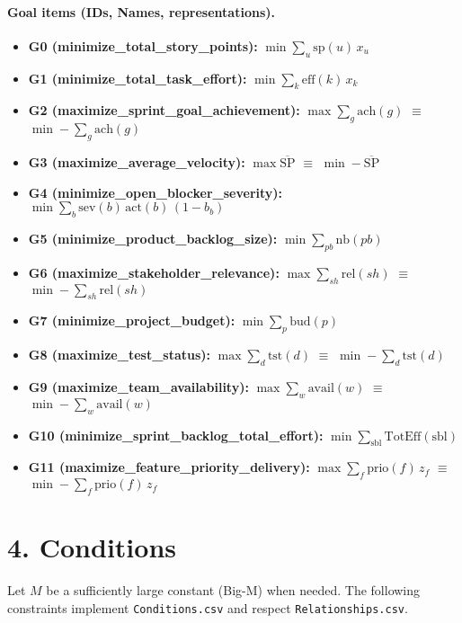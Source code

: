 \documentclass[11pt,a4paper]{article}
\begin{document}
\paragraph{Goal items (IDs, Names, representations).}
\begin{itemize}[leftmargin=2em]
  \item \textbf{G0 (minimize\_total\_story\_points):} $\min \sum_{u}\text{sp}(u)\,x_u$
  \item \textbf{G1 (minimize\_total\_task\_effort):} $\min \sum_{k}\text{eff}(k)\,x_k$
  \item \textbf{G2 (maximize\_sprint\_goal\_achievement):} $\max \sum_{g}\text{ach}(g)$ $\equiv$ $\min -\sum_{g}\text{ach}(g)$
  \item \textbf{G3 (maximize\_average\_velocity):} $\max \overline{\text{SP}}$ $\equiv$ $\min -\overline{\text{SP}}$
  \item \textbf{G4 (minimize\_open\_blocker\_severity):} $\min \sum_{b}\text{sev}(b)\,\text{act}(b)\,(1-b_b)$
  \item \textbf{G5 (minimize\_product\_backlog\_size):} $\min \sum_{pb}\text{nb}(pb)$
  \item \textbf{G6 (maximize\_stakeholder\_relevance):} $\max \sum_{sh}\text{rel}(sh)$ $\equiv$ $\min -\sum_{sh}\text{rel}(sh)$
  \item \textbf{G7 (minimize\_project\_budget):} $\min \sum_{p}\text{bud}(p)$
  \item \textbf{G8 (maximize\_test\_status):} $\max \sum_{d}\text{tst}(d)$ $\equiv$ $\min -\sum_{d}\text{tst}(d)$
  \item \textbf{G9 (maximize\_team\_availability):} $\max \sum_{w}\text{avail}(w)$ $\equiv$ $\min -\sum_{w}\text{avail}(w)$
  \item \textbf{G10 (minimize\_sprint\_backlog\_total\_effort):} $\min \sum_{\mathrm{sbl}}\text{TotEff}(\mathrm{sbl})$
  \item \textbf{G11 (maximize\_feature\_priority\_delivery):} $\max \sum_{f}\text{prio}(f)\,z_f$ $\equiv$ $\min -\sum_{f}\text{prio}(f)\,z_f$
\end{itemize}

\section{4. Conditions}
Let $M$ be a sufficiently large constant (Big-M) when needed. The following constraints implement \texttt{Conditions.csv} and respect \texttt{Relationships.csv}.
\end{document}
